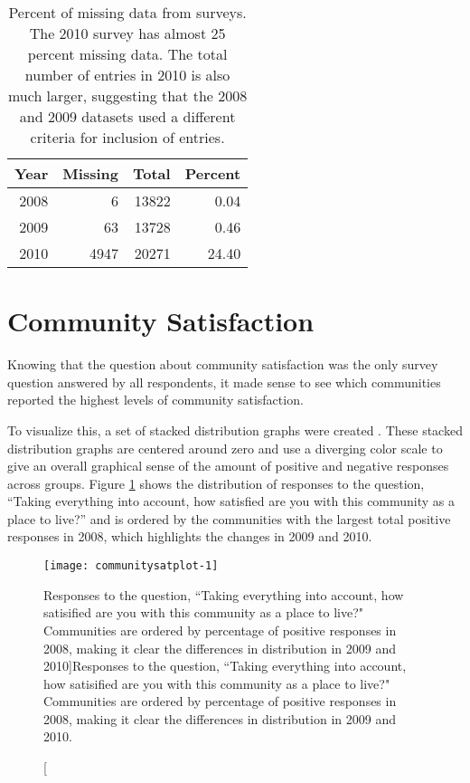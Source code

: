 \documentclass[smallextended]{svjour3}\usepackage[]{graphicx}\usepackage[]{color}
\newenvironment{knitrout}{}{} %
\begin{document}
\begin{table}[ht]
\centering
\begin{tabular}{rrrr}
  \hline
Year & Missing & Total & Percent \\ 
  \hline
2008 &   6 & 13822 & 0.04 \\ 
  2009 &  63 & 13728 & 0.46 \\ 
  2010 & 4947 & 20271 & 24.40 \\ 
   \hline
\end{tabular}
\caption{Percent of missing data from surveys. The 2010 survey has almost 25 percent missing data. The total number of entries in 2010 is also much larger, suggesting that the 2008 and 2009 datasets used a different criteria for inclusion of entries.} 
\label{missingtable}
\end{table}


\section{Community Satisfaction}
\label{communittsatsec}
Knowing that the question about community satisfaction was the only survey question answered by all respondents, it made sense to see which communities reported the highest levels of community satisfaction. 

To visualize this, a set of stacked distribution graphs were created \citep{RobHei2011}. These stacked distribution graphs are centered around zero and use a diverging color scale to give an overall graphical sense of the amount of positive and negative responses across groups. Figure \ref{fig:communitysatplot} shows the distribution of responses to the question, ``Taking everything into account, how satisfied are you with this community as a place to live?'' and is ordered by the communities with the largest total positive responses in 2008, which highlights the changes in 2009 and 2010. 



\begin{knitrout}
\color{fgcolor}\begin{figure}

{\centering \texttt{[image: communitysatplot-1]} 

}

\caption[Responses to the question, ``Taking everything into account, how satisified are you with this community as a place to live?" Communities are ordered by percentage of positive responses in 2008, making it clear the differences in distribution in 2009 and 2010]{Responses to the question, ``Taking everything into account, how satisified are you with this community as a place to live?" Communities are ordered by percentage of positive responses in 2008, making it clear the differences in distribution in 2009 and 2010.}\label{fig:communitysatplot}
\end{figure}


\end{knitrout}
\end{document}
